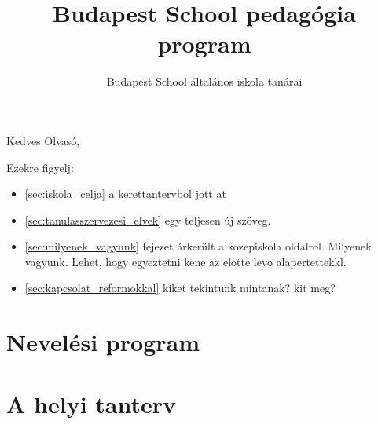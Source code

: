 \documentclass[magyar,12pt,a4paper,draft]{report}
\begin{document}
\newif\ifkerettanterv
\kerettantervfalse

\title{Budapest School pedagógia program}
\author{Budapest School általános iskola tanárai}
\maketitle

Kedves Olvasó,

Ezekre figyelj:
\begin{itemize}
  \item \ref{sec:iskola_celja} a kerettantervbol jott at
\item \ref{sec:tanulasszervezesi_elvek} egy teljesen új szöveg.
\item \ref{sec:milyenek_vagyunk} fejezet árkerült a kozepiskola oldalrol. Milyenek vagyunk. Lehet, hogy egyeztetni kene az elotte levo alapertettekkl.
\item \ref{sec:kapcsolat_reformokkal} kiket tekintunk mintanak? kit meg?
\end{itemize}

\tableofcontents
\newpage
\part{Nevelési program}


\part{A helyi tanterv}



{}
\label{sec:bibliographyk}

\end{document}
